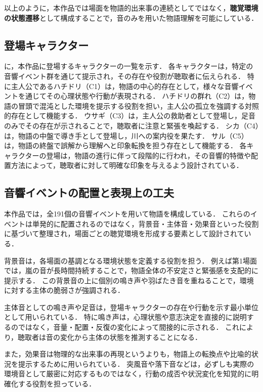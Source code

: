 以上のように，本作品では場面を物語的出来事の連続としてではなく，\textbf{聴覚環境の状態遷移}として構成することで，音のみを用いた物語理解を可能にしている．



\subsection{登場キャラクター}
に，本作品に登場するキャラクターの一覧を示す．
各キャラクターは，特定の音響イベント群を通じて提示され，その存在や役割が聴取者に伝えられる．
特に主人公であるハチドリ（C1）は，物語の中心的存在として，様々な音響イベントを通じてその心理状態や行動が表現される．
ハチドリの群れ（C2）は，物語の冒頭で混沌とした環境を提示する役割を担い，主人公の孤立を強調する対照的存在として機能する．
ウサギ（C3）は，主人公の救助者として登場し，足音のみでその存在が示されることで，聴取者に注意と緊張を喚起する．
シカ（C4）は，物語の中盤で導き手として登場し，川への案内役を果たす．
サル（C5）は，物語の終盤で誤解から理解へと印象転換を担う存在として機能する．
各キャラクターの登場は，物語の進行に伴って段階的に行われ，その音響的特徴や配置方法によって，聴取者に対して明確な印象を与えるよう設計されている．




\subsection{音響イベントの配置と表現上の工夫}

本作品では，全191個の音響イベントを用いて物語を構成している．
これらのイベントは単発的に配置されるのではなく，背景音・主体音・効果音といった役割に基づいて整理され，場面ごとの聴覚環境を形成する要素として設計されている．

背景音は，各場面の基調となる環境状態を定義する役割を担う．
例えば第1場面では，嵐の音が長時間持続することで，物語全体の不安定さと緊張感を支配的に提示する．
この背景音の上に個別の鳴き声や羽ばたき音を重ねることで，環境に対する主体の脆弱さが強調される．

主体音としての鳴き声や足音は，登場キャラクターの存在や行動を示す最小単位として用いられている．
特に鳴き声は，心理状態や意志決定を直接的に説明するのではなく，音量・配置・反復の変化によって間接的に示される．
これにより，聴取者は音の変化から主体の状態を推測することになる．

また，効果音は物理的な出来事の再現というよりも，物語上の転換点や比喩的状況を提示するために用いられている．
突風音や落下音などは，必ずしも実際の環境音として厳密に対応するものではなく，行動の成否や状況変化を知覚的に明確化する役割を担っている．

